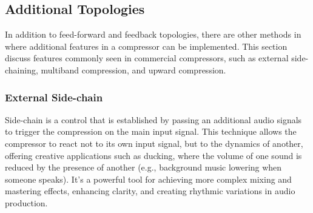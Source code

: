 \documentclass[10pt]{article}
\begin{document}
\begin{multicols*}{2}
\begin{minipage}{\linewidth}
                        
                        \label{fig:feedforward}
                    
                    \end{minipage}
                
                \vspace{2ex}

            \subsection{Additional Topologies}
                In addition to feed-forward and feedback topologies, there are other methods in where additional features in a compressor can be implemented. This section discuss features commonly seen in commercial compressors, such as external side-chaining, multiband compression, and upward compression.

                \subsubsection{External Side-chain}
                    Side-chain is a control that is established by passing an additional audio signals to trigger the compression on the main input signal. This technique allows the compressor to react not to its own input signal, but to the dynamics of another, offering creative applications such as ducking, where the volume of one sound is reduced by the presence of another (e.g., background music lowering when someone speaks). It's a powerful tool for achieving more complex mixing and mastering effects, enhancing clarity, and creating rhythmic variations in audio production.


\end{multicols*}
\end{document}
